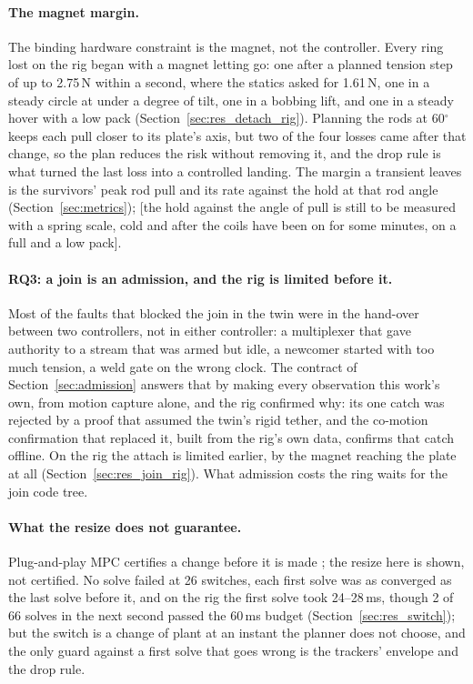 \paragraph{The magnet margin.} The binding hardware constraint is the magnet, not the controller. Every ring lost on
the rig began with a magnet letting go: one after a planned tension step of up to 2.75\,N within a second, where the statics asked for 1.61\,N, one in a
steady circle at under a degree of tilt, one in a bobbing lift, and one in a steady hover with a low pack
(Section~\ref{sec:res_detach_rig}). Planning the rods at 60$^\circ$ keeps each pull closer to its plate's axis, but two of
the four losses came after that change, so the plan reduces the risk without removing it, and the drop rule is what
turned the last loss into a controlled landing. The margin a transient leaves is the survivors' peak rod pull and its
rate against the hold at that rod angle (Section~\ref{sec:metrics}); [the hold against the angle of pull is still to
be measured with a spring scale, cold and after the coils have been on for some minutes, on a full and a low pack].

\paragraph{RQ3: a join is an admission, and the rig is limited before it.} Most of the faults that blocked the join
in the twin were in the hand-over between two controllers, not in either controller: a multiplexer that gave
authority to a stream that was armed but idle, a newcomer started with too much tension, a weld gate on the wrong
clock. The contract of Section~\ref{sec:admission} answers that by making every observation this work's own, from
motion capture alone, and the rig confirmed why: its one catch was rejected by a proof that assumed the twin's rigid
tether, and the co-motion confirmation that replaced it, built from the rig's own data, confirms that catch offline.
On the rig the attach is limited earlier, by the magnet reaching the plate at all (Section~\ref{sec:res_join_rig}).
What admission costs the ring waits for the join code tree.

\paragraph{What the resize does not guarantee.} Plug-and-play MPC certifies a change before it is made
\cite{riverso2013plug, zeilinger2013plug}; the resize here is shown, not certified. No solve failed at 26 switches,
each first solve was as converged as the last solve before it, and on the rig the first solve took 24--28\,ms, though 2 of 66 solves in the next second passed the 60\,ms
budget (Section~\ref{sec:res_switch}); but the switch is a change of plant at an instant the planner does not choose,
and the only guard against a first solve that goes wrong is the trackers' envelope and the drop rule.

